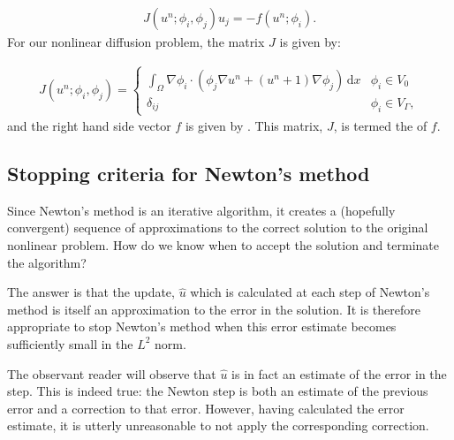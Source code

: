 \documentclass{book}
\begin{document}
\label{\detokenize{8_nonlinear_problems:equation-8_nonlinear_problems:8}}\begin{equation}\label{equation:8_nonlinear_problems:8_nonlinear_problems:8}
\begin{split}J(u^n; \phi_i, \phi_j) \hat{u}_j = - f(u^n; \phi_i).\end{split}
\end{equation}
For our nonlinear diffusion problem, the matrix \(J\) is given by:

\label{\detokenize{8_nonlinear_problems:equation-8_nonlinear_problems:9}}\begin{equation}\label{equation:8_nonlinear_problems:8_nonlinear_problems:9}
\begin{split}J(u^n; \phi_i, \phi_j) =
\begin{cases}
\displaystyle\int_\Omega \nabla \phi_i \cdot \left(\phi_j \nabla u^n + (u^n + 1) \nabla \phi_j \right) \, \mathrm{d} x & \phi_i\in V_0\\
\delta_{ij} & \phi_i \in V_\Gamma,
\end{cases}\end{split}
\end{equation}
and the right hand side vector \(f\) is given by {\hyperref[\detokenize{8_nonlinear_problems:equation-residual}]{}}. This
matrix, \(J\), is termed the  of \(f\).


\subsection{Stopping criteria for Newton’s method}
\label{\detokenize{8_nonlinear_problems:stopping-criteria-for-newton-s-method}}
Since Newton’s method is an iterative algorithm, it creates a
(hopefully convergent) sequence of approximations to the correct
solution to the original nonlinear problem. How do we know when to
accept the solution and terminate the algorithm?

The answer is that the update, \(\hat{u}\) which is calculated at each
step of Newton’s method is itself an approximation to the error in the
solution. It is therefore appropriate to stop Newton’s method when
this error estimate becomes sufficiently small in the \(L^2\) norm.

The observant reader will observe that \(\hat{u}\) is in fact
an estimate of the error in the  step. This is indeed true:
the Newton step is both an estimate of the previous error and a
correction to that error. However, having calculated the error
estimate, it is utterly unreasonable to not apply the corresponding
correction.
\end{document}
